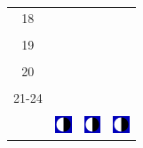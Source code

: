 \documentclass[a4paper,12pt, tikz]{scrartcl}
\begin{document}
\begin{tabularx}{\linewidth}{|c|X|X|X|}
      \hline
      18&   &       &    \\
        &   &       &    \\
      \hline
      19&   &       &    \\
        &   &       &    \\
      \hline
      20&   &       &    \\
        &   &       &    \\
      \hline
      21-24&   &       &    \\
        &   &       &    \\
      \hline  
      & \vspace{0.01cm} \centerline{\includegraphics[width=0.5cm]{moon_phases/Moon_phase_6.svg.png}} \vspace{0.1cm} & \vspace{0.01cm} \centerline{\includegraphics[width=0.5cm]{moon_phases/Moon_phase_6.svg.png}} \vspace{0.1cm} & \vspace{0.01cm} \centerline{\includegraphics[width=0.5cm]{moon_phases/Moon_phase_6.svg.png}} \vspace{0.1cm}\\
      \hline   
    \end{tabularx}




    \newpage

        \noindent
\end{document}
